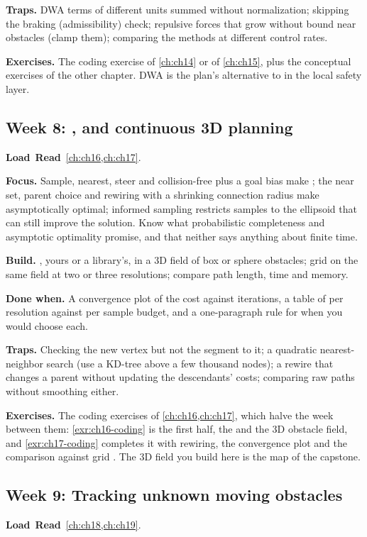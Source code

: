 \textbf{Traps.} DWA terms of different units summed without normalization; skipping the
braking (admissibility) check; repulsive forces that grow without bound near obstacles
(clamp them); comparing the methods at different control rates.

\textbf{Exercises.} The coding exercise of \cref{ch:ch14} or of \cref{ch:ch15}, plus the
conceptual exercises of the other chapter. DWA is the plan's alternative to \orca in the
local safety layer.

\subsection{Week 8: \rrt, \rrtstar and continuous 3D planning}
\label{sec:appA-week08}
\noindent\textbf{Load}\ \quad\textbf{Read}\ \cref{ch:ch16,ch:ch17}.

\textbf{Focus.} Sample, nearest, steer and collision-free plus a goal bias make \rrt; the
near set, parent choice and rewiring with a shrinking connection radius make \rrtstar
asymptotically optimal; informed sampling restricts samples to the ellipsoid that can still
improve the solution. Know what probabilistic completeness and asymptotic optimality
promise, and that neither says anything about finite time.

\textbf{Build.} \rrtstar, yours or a library's, in a 3D field of box or sphere obstacles;
grid \astar on the same field at two or three resolutions; compare path length, time and
memory.

\textbf{Done when.} A convergence plot of the \rrtstar cost against iterations, a table of
\astar per resolution against \rrtstar per sample budget, and a one-paragraph rule for when
you would choose each.

\textbf{Traps.} Checking the new vertex but not the segment to it; a quadratic
nearest-neighbor search (use a KD-tree above a few thousand nodes); a rewire that changes a
parent without updating the descendants' costs; comparing raw paths without smoothing
either.

\textbf{Exercises.} The coding exercises of \cref{ch:ch16,ch:ch17}, which halve the week
between them: \cref{exr:ch16-coding} is the first half, the \rrt and the 3D obstacle
field, and \cref{exr:ch17-coding} completes it with rewiring, the convergence plot and
the comparison against grid \astar. The 3D field you build here is the map of the
capstone.

\subsection{Week 9: Tracking unknown moving obstacles}
\label{sec:appA-week09}
\noindent\textbf{Load}\ \quad\textbf{Read}\ \cref{ch:ch18,ch:ch19}.

